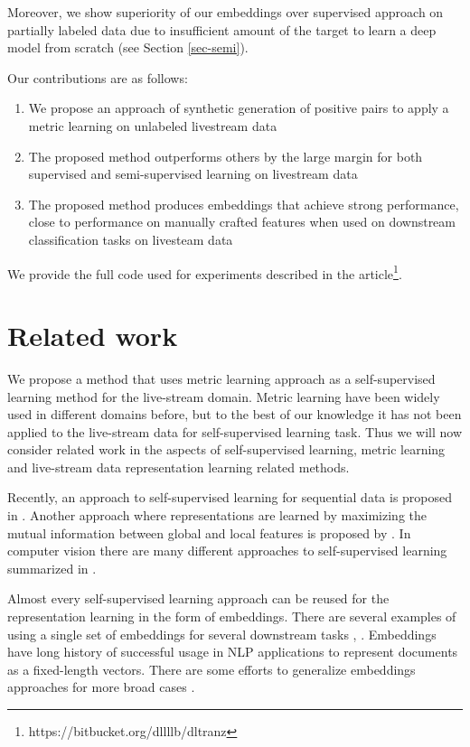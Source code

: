 \documentclass[sigconf]{acmart}
\begin{document}
Moreover, we show superiority of our embeddings over supervised approach on partially labeled data due to insufficient amount of the target to learn a deep model from scratch (see Section \ref{sec-semi}).

Our contributions are as follows:
\begin{enumerate}
    \item We propose an approach of synthetic generation of positive pairs to apply a metric learning on unlabeled livestream data
    \item The proposed method outperforms others by the large margin for both supervised and semi-supervised learning on livestream data
    \item The proposed method produces embeddings that achieve strong performance, close to performance on manually crafted features when used on downstream classification tasks on livesteam data
\end{enumerate}

We provide the full code used for experiments described in the article\footnote{https://bitbucket.org/dllllb/dltranz}.

\section{Related work}  \label{sec-rel-work}

We propose a method that uses metric learning approach as a self-supervised learning method for the live-stream domain. Metric learning have been widely used in different domains before, but to the best of our knowledge it has not been applied to the live-stream data for self-supervised learning task. Thus we will now consider related work in the aspects of self-supervised learning, metric learning and live-stream data representation learning related methods.

Recently, an approach to self-supervised learning for sequential data is proposed in \cite{DBLP:journals/corr/abs-1807-03748}. Another approach where representations are learned by maximizing the mutual information between global and local features is proposed by \cite{hjelm2018learning}. In computer vision there are many different approaches to self-supervised learning summarized in \cite{jing2019selfsupervised}.

Almost every self-supervised learning approach can be reused for the representation learning in the form of embeddings. There are several examples of using a single set of embeddings for several downstream tasks \cite{Song2017LearningUE}, \cite{Zhai:2019:LUE:3292500.3330739}.
Embeddings have long history of successful usage in NLP applications to represent documents as a fixed-length vectors. There are some efforts to generalize embeddings approaches for more broad cases \cite{Wu2017StarSpaceEA}.
\end{document}
